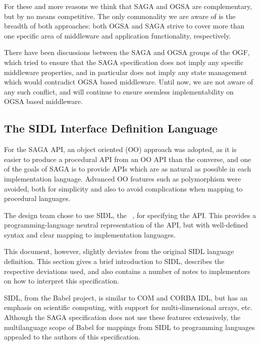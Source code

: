   For these and more reasons we think that SAGA and OGSA are
  complementary, but by no means competitive.  The only
  commonality we are aware of is the breadth of
  both approaches: both OGSA and SAGA strive to cover more than one
  specific area of middleware and application functionality,
  respectively.

  There have been discussions between the SAGA and OGSA groups
  of the OGF, which tried to ensure that the SAGA
  specification does not imply any specific middleware properties, and
  in particular does not imply any state management which would
  contradict OGSA based middleware.  Until now, we are not aware of
  any such conflict, and will continue to ensure seemless
  implementability on OGSA based middleware.


 \subsection{The SIDL Interface Definition Language}
 \label{ssec:sidl}

  For the SAGA API, an object oriented (OO) approach was
  adopted, as it is easier to produce a procedural API from an
  OO API than the converse, and one of the goals of SAGA is to
  provide APIs which are as natural as possible in each
  implementation language.  Advanced OO features such as
  polymorphism were avoided, both for simplicity and also to
  avoid complications when mapping to procedural languages.

  The design team chose to use SIDL, the ~\cite{sidl}, for specifying the
  API.  This provides a programming-language neutral
  representation of the API, but with well-defined syntax and
  clear mapping to implementation languages.
  
  This document, however, slightly deviates from the original
  SIDL language definition. This section gives a brief
  introduction to SIDL, describes the respective deviations
   used, and also contains a number of notes to
  implementors on how to interpret this specification.

  SIDL, from the Babel project, is similar to COM and CORBA IDL,
  but has an emphasis on scientific computing, with support
  for multi-dimensional arrays, etc.  Although the
  SAGA specification does not use these features
  extensively, the multilanguage scope of Babel for mappings
  from SIDL to programming languages appealed to the authors of
  this specification.


